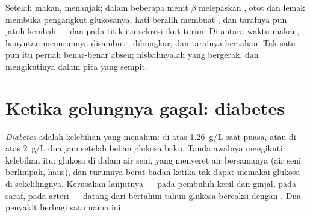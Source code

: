 \begin{example}\label{ex:g12:glucose-and-diabetes:loop}
Setelah makan,  menanjak; dalam beberapa menit  $\beta$
melepaskan , otot dan  lemak membuka pengangkut glukosanya,
hati beralih membuat , dan tarafnya pun jatuh kembali --- dan
pada titik itu sekresi  ikut turun. Di antara waktu makan,
hanyutan menurunnya disambut ,  dibongkar, dan
tarafnya bertahan. Tak satu pun  itu pernah benar-benar absen;
nisbahnyalah yang bergerak, dan  mengikutinya dalam pita yang
sempit.
\end{example}

\section{Ketika gelungnya gagal: diabetes}

\begin{definition}[Diabetes]\label{def:g12:glucose-and-diabetes:diabetes}
\emph{Diabetes} adalah kelebihan  yang menahun:
di atas \qty{1.26}{g/L} saat puasa, atau di atas \qty{2}{g/L} dua jam
setelah beban glukosa baku. Tanda awalnya mengikuti kelebihan itu:
glukosa di dalam air seni, yang menyeret air bersamanya (air seni
berlimpah, haus), dan turunnya berat badan ketika  tak dapat
memakai glukosa di sekelilingnya. Kerusakan lanjutnya --- pada pembuluh
kecil  dan ginjal, pada saraf, pada arteri --- datang dari
bertahun-tahun glukosa bereaksi dengan . Dua penyakit berbagi
satu nama ini.
\end{definition}

